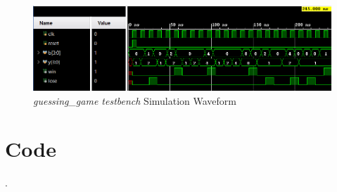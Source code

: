 \documentclass[11pt]{article}
\begin{document}
\begin{figure}[ht]\centering
	\includegraphics[width=1.1\textwidth]{gsfmtest}
	\caption{\textit{guessing\_game testbench} Simulation Waveform}
	\label{fig:sim_with_table}
\end{figure}

\clearpage

\section*{Code}
.
\end{document}

